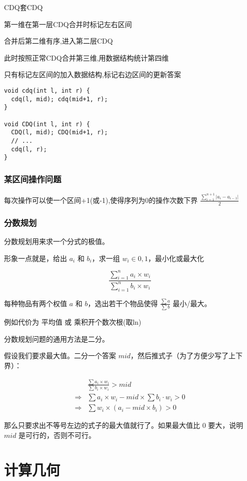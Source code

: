 \documentclass[12pt]{article}
\begin{document}
{{{{{{{{{CDQ套CDQ

第一维在第一层CDQ合并时标记左右区间

合并后第二维有序,进入第二层CDQ

此时按照正常CDQ合并第三维,用数据结构统计第四维

只有标记左区间的加入数据结构,标记右边区间的更新答案

{\setmainfont{Consolas}
\begin{lstlisting}
void cdq(int l, int r) {
  cdq(l, mid); cdq(mid+1, r);
}

void CDQ(int l, int r) {
  CDQ(l, mid); CDQ(mid+1, r);
  // ...
  cdq(l, r);
}
\end{lstlisting}

\section{ 某区间操作问题}

每次操作可以使一个区间+1(或-1),使得序列为0的操作次数下界 $\frac{\sum\limits_{i=1}^{n+1} | a_i-a_{i-1} |}{2}$

\section{ 分数规划}
分数规划用来求一个分式的极值。

形象一点就是，给出 $a_i$ 和 $b_i$，求一组 $w_i\in{0,1}$，最小化或最大化

$$ \displaystyle\frac{\sum\limits_{i=1}^na_i\times w_i}{\sum\limits_{i=1}^nb_i\times w_i} $$

每种物品有两个权值 $a$ 和 $b$，选出若干个物品使得 $\displaystyle\frac{\sum a}{\sum b}$ 最小/最大。

例如代价为 平均值 或 乘积开个数次根(取ln)

分数规划问题的通用方法是二分。

假设我们要求最大值。二分一个答案 $mid$，然后推式子（为了方便少写了上下界）：

$$\displaystyle
\begin{aligned}
&\frac{\sum a_i\times w_i}{\sum b_i\times w_i}>mid\\ 
\Longrightarrow&\sum a_i\times w_i-mid\times \sum b_i\cdot w_i>0\\ 
\Longrightarrow&\sum w_i\times(a_i-mid\times b_i)>0 \end{aligned}$$

那么只要求出不等号左边的式子的最大值就行了。如果最大值比 $0$ 要大，说明 $mid$ 是可行的，否则不可行。


\part{计算几何}
}}}}}}}}}}
\end{document}
